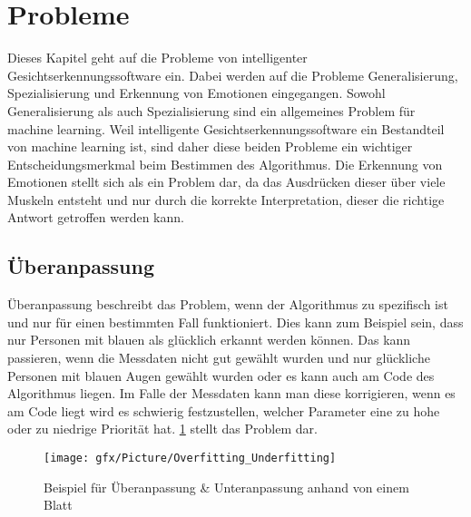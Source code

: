 \section{Probleme}
\label{sec:background:second_section}
Dieses Kapitel geht auf die Probleme von intelligenter Gesichtserkennungssoftware ein.
Dabei werden auf die Probleme Generalisierung, Spezialisierung und Erkennung von Emotionen eingegangen.
Sowohl Generalisierung als auch Spezialisierung sind ein allgemeines Problem für machine learning.
Weil intelligente Gesichtserkennungssoftware ein Bestandteil von machine learning ist, sind daher diese beiden Probleme ein wichtiger Entscheidungsmerkmal beim Bestimmen des Algorithmus. \cite{Zhi-Hua}
Die Erkennung von Emotionen stellt sich als ein Problem dar, da das Ausdrücken dieser über viele Muskeln entsteht und nur durch die korrekte Interpretation, dieser die richtige Antwort getroffen werden kann. \cite{Emotion2020}

\subsection{Überanpassung}
\label{ssubsec:background:second_section:second_subsection}
Überanpassung beschreibt das Problem, wenn der Algorithmus zu spezifisch ist und nur für einen bestimmten Fall funktioniert. \cite{Zhi-Hua}
Dies kann zum Beispiel sein, dass nur Personen mit blauen als glücklich erkannt werden können. 
Das kann passieren, wenn die Messdaten nicht gut gewählt wurden und nur glückliche Personen mit blauen Augen gewählt wurden oder es kann auch am Code des Algorithmus liegen.
Im Falle der Messdaten kann man diese korrigieren, wenn es am Code liegt wird es schwierig festzustellen, welcher Parameter eine zu hohe oder zu niedrige Priorität hat.
\ref{fig:Fitting} stellt das Problem dar.


\begin{figure}[h!]
 \centering
 \texttt{[image: gfx/Picture/Overfitting\_Underfitting]}
 \caption{Beispiel f{\"u}r {\"U}beranpassung \& Unteranpassung anhand von einem Blatt \cite{Zhi-Hua}}
 \label{fig:Fitting}
\end{figure}

